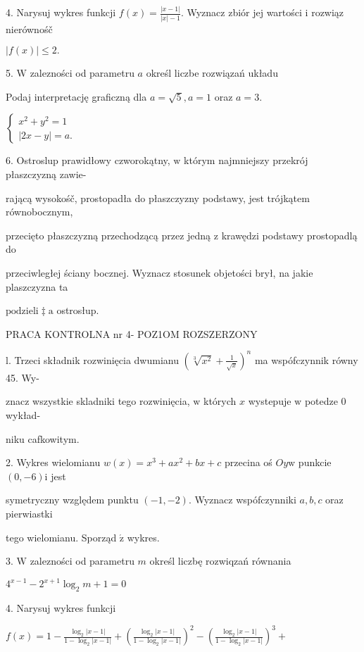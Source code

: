 \documentclass[a4paper,12pt]{article}
\begin{document}
4. Narysuj wykres funkcji $f(x)=\displaystyle \frac{|x-1|}{|x|-1}$. Wyznacz zbiór jej wartości $\mathrm{i}$ rozwiąz nierównośč

$|f(x)|\leq 2.$

5. $\mathrm{W}$ zalezności od parametru $a$ określ liczbe rozwiązań układu

Podaj interpretację graficzną dla $a=\sqrt{5}, a=1$ oraz $a=3.$

$\left\{\begin{array}{l}
x^{2}+y^{2}=1\\
|2x-y|=a.
\end{array}\right.$

6. Ostroslup prawidłowy czworokątny, $\mathrm{w}$ którym najmniejszy przekrój płaszczyzną zawie-

rającą wysokośč, prostopadła do płaszczyzny podstawy, jest trójkątem równobocznym,

przecięto płaszczyzną przechodzącą przez jedną $\mathrm{z}$ krawędzi podstawy prostopadlą do

przeciwległej ściany bocznej. Wyznacz stosunek objetości brył, na jakie plaszczyzna ta

$\mathrm{p}\mathrm{o}\mathrm{d}\mathrm{z}\mathrm{i}\mathrm{e}\mathrm{l}\mathrm{i}\ddagger \mathrm{a}$ ostrosłup.




PRACA KONTROLNA nr 4- POZ1OM ROZSZERZONY

l. Trzeci składnik rozwinięcia dwumianu $(\displaystyle \sqrt[3]{x^{2}}+\frac{1}{\sqrt{x}})^{n}$ ma wspófczynnik równy 45. Wy-

znacz wszystkie skladniki tego rozwinięcia, $\mathrm{w}$ których $x$ wystepuje $\mathrm{w}$ potedze $0$ wykład-

niku cafkowitym.

2. Wykres wielomianu $w(x) =x^{3}+ax^{2}+bx+c$ przecina oś $Oy\mathrm{w}$ punkcie $(0,-6) \mathrm{i}$ jest

symetryczny względem punktu $(-1,-2)$. Wyznacz wspófczynniki $a, b, c$ oraz pierwiastki

tego wielomianu. Sporząd $\acute{\mathrm{z}}$ wykres.

3. $\mathrm{W}$ zalezności od parametru $m$ określ liczbę rozwiqzań równania

$4^{x-1}-2^{x+1}\log_{2}m+1=0$

4. Narysuj wykres funkcji

$f(x)=1-\displaystyle \frac{\log_{2}|x-1|}{1-\log_{2}|x-1|}+(\frac{\log_{2}|x-1|}{1-\log_{2}|x-1|})^{2}-(\frac{\log_{2}|x-1|}{1-\log_{2}|x-1|})^{3}+$
\end{document}
